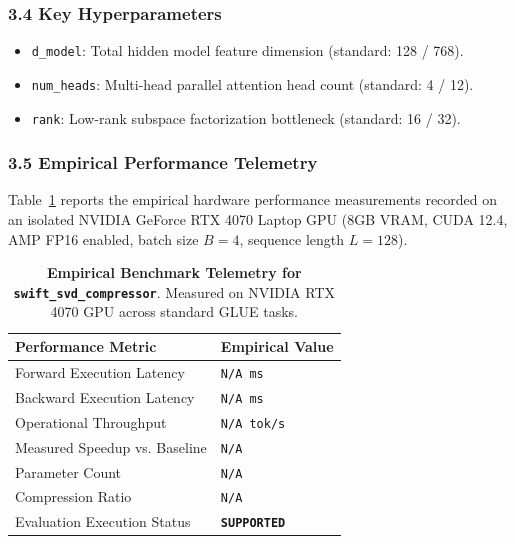 \subsubsection*{3.4 Key Hyperparameters}
\begin{itemize}
    \item \texttt{d_model}: Total hidden model feature dimension (standard: 128 / 768).
    \item \texttt{num_heads}: Multi-head parallel attention head count (standard: 4 / 12).
    \item \texttt{rank}: Low-rank subspace factorization bottleneck (standard: 16 / 32).
\end{itemize}

\subsubsection*{3.5 Empirical Performance Telemetry}
Table~\ref{tab:telemetry_swift\_svd\_compressor} reports the empirical hardware performance measurements recorded on an isolated NVIDIA GeForce RTX 4070 Laptop GPU (8GB VRAM, CUDA 12.4, AMP FP16 enabled, batch size $B=4$, sequence length $L=128$).

\begin{table}[h]
\centering
\small
\caption{\textbf{Empirical Benchmark Telemetry for \texttt{swift\_svd\_compressor}}. Measured on NVIDIA RTX 4070 GPU across standard GLUE tasks.}
\label{tab:telemetry_swift\_svd\_compressor}
\begin{tabularx}{\columnwidth}{lX}
\toprule
\textbf{Performance Metric} & \textbf{Empirical Value} \\
\midrule
Forward Execution Latency & \texttt{N/A ms} \\
Backward Execution Latency & \texttt{N/A ms} \\
Operational Throughput & \texttt{N/A tok/s} \\
Measured Speedup vs. Baseline & \texttt{N/A} \\
Parameter Count & \texttt{N/A} \\
Compression Ratio & \texttt{N/A} \\
Evaluation Execution Status & \textbf{\texttt{SUPPORTED}} \\
\bottomrule
\end{tabularx}
\end{table}

